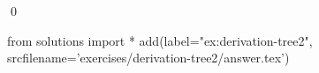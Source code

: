 
\begin{ex} 
  \label{ex:derivation-tree2}
  
  \qed
\end{ex} 
\begin{python0}
from solutions import *
add(label="ex:derivation-tree2",
    srcfilename='exercises/derivation-tree2/answer.tex') 
\end{python0}
